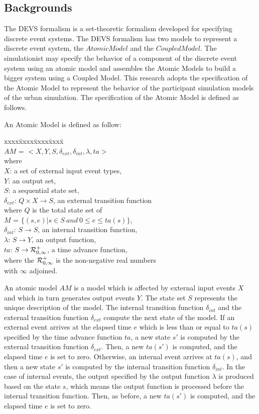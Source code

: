 \documentclass{scsSimAUDPaperFormat}
\begin{document}
\subsection{Backgrounds}
The DEVS formalism is a set-theoretic formalism developed for specifying discrete event systems. The DEVS formalism has two models to represent a discrete event system, the $Atomic Model$ and the $Coupled Model$. 
The simulationist may specify the behavior of a component of the discrete event system using an atomic model and assembles the Atomic Models to build a bigger system using a Coupled Model. This research adopts the specification of the Atomic Model to represent the behavior of the participant simulation models of the urban simulation. The specification of the Atomic Model is defined as follows.

An Atomic Model is defined as follow:
\begin{tabbing}
xxxx\=xxxx\=xxxx\=xxxx\=\kill\\
\> \> \> $AM$ = $<X, Y, S, \delta_{ext}, \delta_{int}, \lambda, ta>$\\
where\\
\> $X$: a set of external input event types,\\
\> $Y$: an output set,\\
\> $S$: a sequential state set,\\
\> $\delta_{ext}$: $Q \times X \rightarrow S$, an external transition function\\
\> \> where $Q$ is the total state set of \\
\> \> $M$ = $\{(s,e)|s \in S\:and\:0 \leq e \leq ta(s)\}$,\\
\> $\delta_{int}$: $S \rightarrow S$, an internal transition function,\\
\> $\lambda$: $S \rightarrow Y$, an output function,\\
\> $ta$: $S \rightarrow {\cal R}^{+}_{0,\infty}$, a time advance function, \\
\> \> where the ${\cal R}^{+}_{0,\infty}$ is the non-negative real numbers \\
\> \> with $\infty$ adjoined.
\end{tabbing}

An atomic model $AM$ is a model which is affected by external input events
$X$ and which in turn generates output events $Y$.
The state set $S$ represents the unique description of the model.
The internal transition function $\delta_{int}$ and the external transition
function $\delta_{ext}$ compute the next state of the model.
If an external event arrives at the elapsed time $e$ which is less than or
equal to $ta(s)$ specified by the time advance function $ta$, a new
state $s'$ is computed by the external transition function $\delta_{ext}$.
Then, a new $ta(s')$ is computed, and the elapsed time $e$ is set to zero.
Otherwise, an internal event arrives at $ta(s)$, and then a new state
$s'$ is computed by the internal transition function $\delta_{int}$.
In the case of internal events, the output specified by the output function
$\lambda$ is produced based on the state $s$, which means the output function
is processed before the internal transition function.
Then, as before, a new $ta(s')$ is computed, and the elapsed time $e$ is set to zero. 
\end{document}
